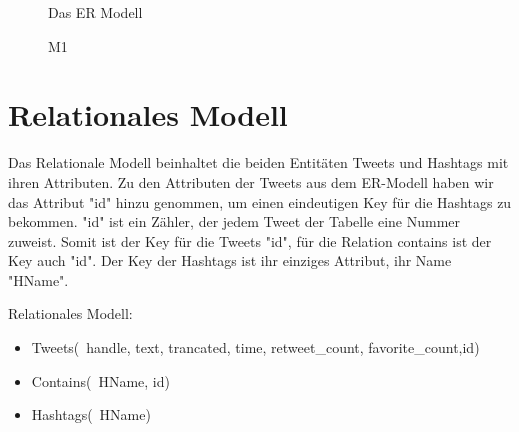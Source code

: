 \documentclass[a4paper]{article}
\begin{document}
\begin{figure}[htbp]
\centering
{}
\caption{M1} \label{fig:M1} Das ER Modell
\end{figure}

\section{Relationales Modell}
Das Relationale Modell beinhaltet die beiden Entitäten Tweets und Hashtags mit ihren Attributen. Zu den Attributen der Tweets aus dem ER-Modell haben wir das Attribut "id" hinzu genommen, um einen eindeutigen Key für die Hashtags zu bekommen. "id" ist ein Zähler, der jedem Tweet der Tabelle eine Nummer zuweist. 
Somit ist der Key für die Tweets "id", für die Relation contains ist der Key auch "id". 
Der Key der Hashtags ist ihr einziges Attribut, ihr Name "HName". 

Relationales Modell:
\begin{itemize}
\item Tweets(\ handle, text, trancated, time, retweet\_count, favorite\_count,id) 
\item Contains(\ HName, id)
\item Hashtags(\ HName)
\end{itemize}
\end{document}

